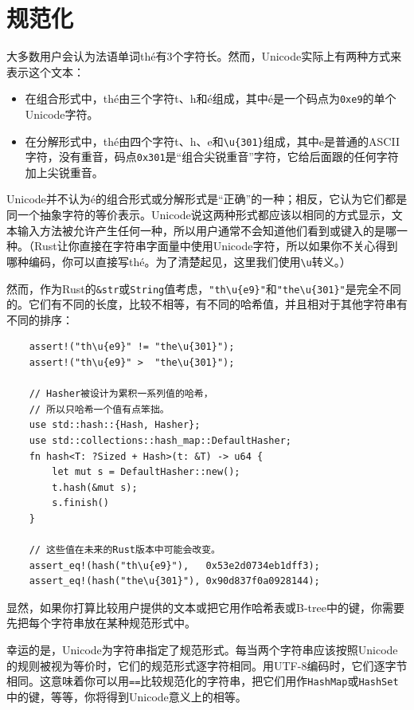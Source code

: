 \section{规范化}

大多数用户会认为法语单词thé有3个字符长。然而，Unicode实际上有两种方式来表示这个文本：
\begin{itemize}
    \item 在组合形式中，thé由三个字符t、h和é组成，其中é是一个码点为\texttt{0xe9}的单个Unicode字符。
    \item 在分解形式中，thé由四个字符t、h、e和\texttt{\textbackslash u\{301\}}组成，其中e是普通的ASCII字符，没有重音，码点\texttt{0x301}是“组合尖锐重音”字符，它给后面跟的任何字符加上尖锐重音。
\end{itemize}

Unicode并不认为é的组合形式或分解形式是“正确”的一种；相反，它认为它们都是同一个抽象字符的等价表示。Unicode说这两种形式都应该以相同的方式显示，文本输入方法被允许产生任何一种，所以用户通常不会知道他们看到或键入的是哪一种。（Rust让你直接在字符串字面量中使用Unicode字符，所以如果你不关心得到哪种编码，你可以直接写thé。为了清楚起见，这里我们使用\texttt{\textbackslash u}转义。）

然而，作为Rust的\texttt{\&str}或\texttt{String}值考虑，\texttt{"th\textbackslash u\{e9\}"}和\texttt{"the\textbackslash u\{301\}"}是完全不同的。它们有不同的长度，比较不相等，有不同的哈希值，并且相对于其他字符串有不同的排序：
\begin{verbatim}
    assert!("th\u{e9}" != "the\u{301}");
    assert!("th\u{e9}" >  "the\u{301}");

    // Hasher被设计为累积一系列值的哈希，
    // 所以只哈希一个值有点笨拙。
    use std::hash::{Hash, Hasher};
    use std::collections::hash_map::DefaultHasher;
    fn hash<T: ?Sized + Hash>(t: &T) -> u64 {
        let mut s = DefaultHasher::new();
        t.hash(&mut s);
        s.finish()
    }

    // 这些值在未来的Rust版本中可能会改变。
    assert_eq!(hash("th\u{e9}"),   0x53e2d0734eb1dff3);
    assert_eq!(hash("the\u{301}"), 0x90d837f0a0928144);
\end{verbatim}

显然，如果你打算比较用户提供的文本或把它用作哈希表或B-tree中的键，你需要先把每个字符串放在某种规范形式中。

幸运的是，Unicode为字符串指定了规范形式。每当两个字符串应该按照Unicode的规则被视为等价时，它们的规范形式逐字符相同。用UTF-8编码时，它们逐字节相同。这意味着你可以用\texttt{==}比较规范化的字符串，把它们用作\texttt{HashMap}或\texttt{HashSet}中的键，等等，你将得到Unicode意义上的相等。


